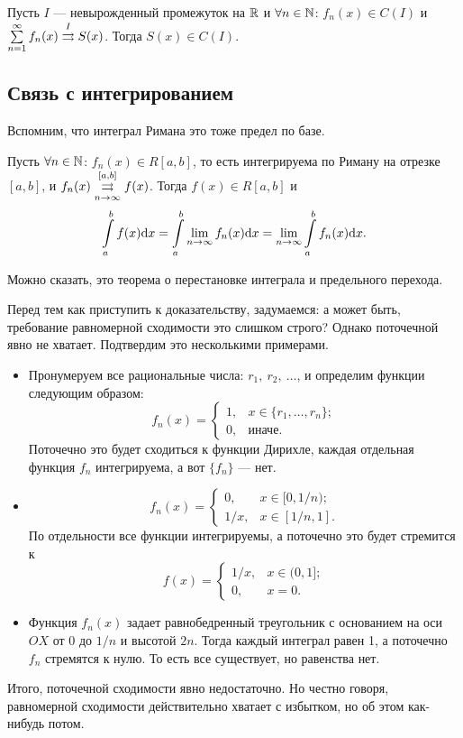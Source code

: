 \begin{Consequence}
	Пусть $I$ --- невырожденный промежуток на $\mathbb{R}$ и $\forall n \in \mathbb{N}$: $f_n(x) \in C(I)$ и $\sum\limits_{n=1}^{\infty} f_n(x) \overset{I}{\rightrightarrows} S(x)$. Тогда $S(x) \in C(I)$. 
\end{Consequence}

\subsection{Связь с интегрированием}
Вспомним, что интеграл Римана это тоже предел по базе.
\begin{Statement}
	Пусть $\forall n \in \mathbb{N}$: $f_n(x) \in R[a, b]$, то есть интегрируема по Риману на отрезке $[a, b]$, и $f_n(x) \overset{[a, b]}{\underset{n \to \infty}{\rightrightarrows}} f(x)$.  Тогда $f(x) \in R[a, b]$ и 
	$$
	\int\limits_a^b f(x) \mathrm{d}x = \int\limits_a^b\lim\limits_{n \to \infty} f_n(x) \mathrm{d}x = \lim\limits_{n \to \infty} \int\limits_a^b f_n(x) \mathrm{d}x.
	$$
\end{Statement}

Можно сказать, это теорема о перестановке интеграла и предельного перехода.

Перед тем как приступить к доказательству, задумаемся: а может быть, требование равномерной сходимости это слишком строго? Однако поточечной явно не хватает. Подтвердим это несколькими примерами.
\begin{itemize}
\item
Пронумеруем все рациональные числа: $r_1,\ r_2,\ \ldots$, и определим функции следующим образом:
$$
f_n(x) = \begin{cases}
1, & x \in \{r_1, \ldots, r_n \}; \\
0, & \text{иначе}.
\end{cases}
$$
Поточечно это будет сходиться к функции Дирихле, каждая отдельная функция $f_n$ интегрируема, а вот $\{f_n\}$ --- нет. 
\item
$$
f_n(x) = \begin{cases}
0, & x \in [0, 1/n); \\
1/x, & x \in [1/n, 1].
\end{cases}
$$
По отдельности все функции интегрируемы, а поточечно это будет стремится к 
$$
f(x) = \begin{cases}
1/x, & x \in (0, 1]; \\
0, & x = 0.
\end{cases}
$$
\item
Функция $f_n(x)$ задает равнобедренный треугольник с основанием на оси $OX$ от 0 до $1/n$ и высотой $2n$. Тогда каждый интеграл равен 1, а поточечно $f_n$ стремятся к нулю. То есть все существует, но равенства нет. 
\end{itemize}
Итого, поточечной сходимости явно недостаточно. Но честно говоря, равномерной сходимости действительно хватает с избытком, но об этом как-нибудь потом.

